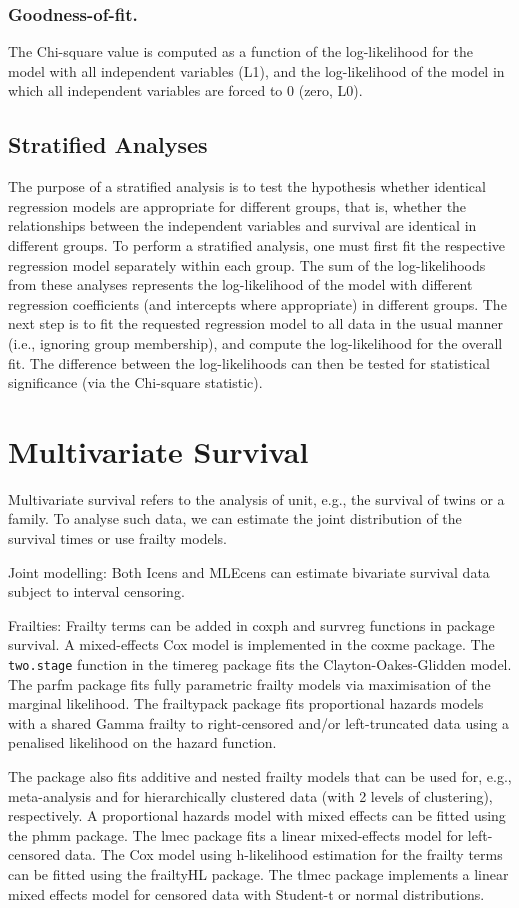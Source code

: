 \documentclass[11pt]{article} %
\begin{document}
\subsubsection*{Goodness-of-fit.} The Chi-square value is computed as a function of the log-likelihood for the model with all independent variables (L1), and the log-likelihood of the model in which all independent variables are forced to 0 (zero, L0).

\subsection{Stratified Analyses}

The purpose of a stratified analysis is to test the hypothesis whether identical regression models are appropriate for different groups, that is, whether the relationships between the independent variables and survival are identical in different groups. To perform a stratified analysis, one must first fit the respective regression model separately within each group. The sum of the log-likelihoods from these analyses represents the log-likelihood of the model with different regression coefficients (and intercepts where appropriate) in different groups. The next step is to fit the requested regression model to all data in the usual manner (i.e., ignoring group membership), and compute the log-likelihood for the overall fit. The difference between the log-likelihoods can then be tested for statistical significance (via the Chi-square statistic). 
\newpage
\section{Multivariate Survival}
Multivariate survival refers to the analysis of unit, e.g., the survival of twins or a family. To analyse such data, we can estimate the joint distribution of the survival times or use frailty models. 

Joint modelling: Both Icens and MLEcens can estimate bivariate survival data subject to interval censoring. 

Frailties: Frailty terms can be added in coxph and survreg functions in package survival. A mixed-effects Cox model is implemented in the coxme package. The \texttt{two.stage} function in the timereg package fits the Clayton-Oakes-Glidden model. The parfm package fits fully parametric frailty models via maximisation of the marginal likelihood. The frailtypack package fits proportional hazards models with a shared Gamma frailty to right-censored and/or left-truncated data using a penalised likelihood on the hazard function. 

The package also fits additive and nested frailty models that can be used for, e.g., meta-analysis and for hierarchically clustered data (with 2 levels of clustering), respectively. A proportional hazards model with mixed effects can be fitted using the phmm package. The lmec package fits a linear mixed-effects model for left-censored data. The Cox model using h-likelihood estimation for the frailty terms can be fitted using the frailtyHL package. The tlmec package implements a linear mixed effects model for censored data with Student-t or normal distributions. 
 
\end{document}
